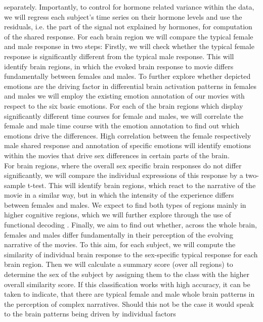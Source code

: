 \documentclass[11pt,a4paper]{article}
\begin{document}
separately. Importantly, to control for hormone related variance within the data, we will regress each
subject's time series on their hormone levels and use the residuals, i.e. the part of the signal not explained
by hormones, for computation of the shared response.
For each brain region we will compare the typical female and male response in two steps: Firstly, we will
check whether the typical female response is significantly different from the typical male response. This
will identify brain regions, in which the evoked brain response to movie differs fundamentally between
females and males. To further explore whether depicted emotions are the driving factor in differential brain
activation patterns in females and males we will employ the existing emotion annotation of our movies with
respect to the six basic emotions. For each of the brain regions which display significantly different time
courses for female and males, we will correlate the female and male time course with the emotion
annotation to find out which emotions drive the differences. High correlation between the female
respectively male shared response and annotation of specific emotions will identify emotions within the
movies that drive sex differences in certain parts of the brain.\\
For brain regions, where the overall sex specific brain responses do not differ significantly, we will compare
the individual expressions of this response by a two-sample t-test. This will identify brain regions, which
react to the narrative of the movie in a similar way, but in which the intensity of the experience differs
between females and males. We expect to find both types of regions mainly in higher cognitive regions,
which we will further explore through the use of functional decoding \parencite{foxMetaanalysisHumanNeuroimaging2014a}.
Finally, we aim to find out whether, across the whole brain, females and males differ fundamentally in their
perception of the evolving narrative of the movies. To this aim, for each subject, we will compute the
similarity of individual brain response to the sex-specific typical response for each brain region. Then we
will calculate a summary score (over all regions) to determine the sex of the subject by assigning them to
the class with the higher overall similarity score. If this classification works with high accuracy, it can be
taken to indicate, that there are typical female and male whole brain patterns in the perception of complex
narratives. Should this not be the case it would speak to the brain patterns being driven by individual factors
\end{document}
